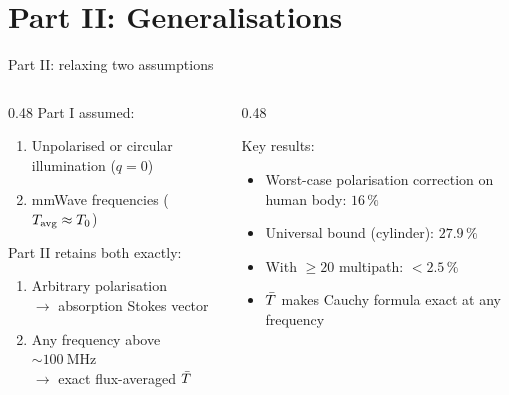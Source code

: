 
\section{Part II: Generalisations}

\begin{frame}{Part II: relaxing two assumptions}
\hypertarget{sec:part2}{}

  \begin{columns}[T]
    \begin{column}{0.48\textwidth}
      Part I assumed:
      \begin{enumerate}
        \item Unpolarised or circular illumination ($q = 0$)
        \item mmWave frequencies ($T_{\mathrm{avg}} \approx T_0$)
      \end{enumerate}

      \vspace{8pt}
      Part II retains both exactly:
      \begin{enumerate}
        \item Arbitrary polarisation\\
              $\rightarrow$ absorption Stokes vector
        \item Any frequency above ${\sim}\SI{100}{\mega\hertz}$\\
              $\rightarrow$ exact flux-averaged $\bar{T}$
      \end{enumerate}
    \end{column}

    \begin{column}{0.48\textwidth}
      \vspace{12pt}
      {\small
      Key results:
      \begin{itemize}
        \item Worst-case polarisation correction on human body: $16\,\%$
        \item Universal bound (cylinder): $27.9\,\%$
        \item With $\ge 20$ multipath: $< 2.5\,\%$
        \item $\bar{T}$ makes Cauchy formula exact at any frequency
      \end{itemize}
      }
    \end{column}
  \end{columns}
\end{frame}

